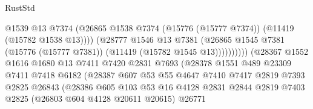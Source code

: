 \begin{lexlean}{RustStd}
\begin{coremodule}
                                            @1539
                                            @13
                                            @7374
                                            (@26865
                                              @1538
                                              @7374
                                              (@15776 (@15777 @7374))
                                              (@11419 (@15782 @1538 @13))))
                                          (@28777
                                            @1546
                                            @13
                                            @7381
                                            (@26865
                                              @1545
                                              @7381
                                              (@15776 (@15777 @7381))
                                              (@11419 (@15782 @1545 @13))))))))))
                              (@28367
                                @1552
                                @1616
                                @1680
                                @13
                                @7411
                                @7420
                                @2831
                                @7693
                                (@28378
                                  @1551
                                  @489
                                  @23309
                                  @7411
                                  @7418
                                  @6182
                                  (@28387
                                    @607
                                    @53
                                    @55
                                    @4647
                                    @7410
                                    @7417
                                    @2819
                                    @7393
                                    @2825
                                    @26843
                                    (@28386
                                      @605
                                      @103
                                      @53
                                      @16
                                      @4128
                                      @2831
                                      @2844
                                      @2819
                                      @7403
                                      @2825
                                      (@26803 @604 @4128 @20611 @20615)
                                      @26771

\end{coremodule}
\end{lexlean}
